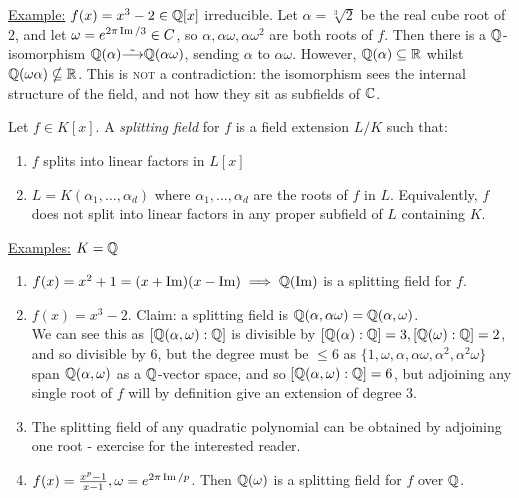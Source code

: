 \documentclass[a4paper, 10pt, twocolumn]{amsart}
\begin{document}
\underline{Example:} $f(x) = x^3-2 \in \mathbb{Q}[x]$ irreducible. Let $\alpha=\sqrt[3]{2}$ be the real cube root of $2$, and let $\omega = e^{2\pi\operatorname{Im}/3} \in C$, so $\alpha, \alpha\omega, \alpha\omega^2$ are both roots of $f$. Then there is a $\mathbb{Q}$-isomorphism $\mathbb{Q}(\alpha)\tilde{\longrightarrow} \mathbb{Q}(\alpha\omega)$, sending $\alpha$ to $\alpha\omega$. However, $\mathbb{Q}(\alpha)\subseteq \mathbb{R}$ whilst $\mathbb{Q}(\omega\alpha) \nsubseteq \mathbb{R}$. This is \textsc{not} a contradiction: the isomorphism sees the internal structure of the field, and not how they sit as subfields of $\mathbb{C}$.

Let $f\in K[x]$. A \emph{splitting field} for $f$ is a field extension $L/K$ such that:
\begin{enumerate}
\item $f$ splits into linear factors in $L[x]$
\item $L=K(\alpha_1, \ldots, \alpha_d)$ where $\alpha_1, \ldots, \alpha_d$ are the roots of $f$ in $L$. Equivalently, $f$ does not split into linear factors in any proper subfield of $L$ containing $K$.
\end{enumerate}

\underline{Examples:} $K = \mathbb{Q}$
\begin{enumerate}
\item $f(x) = x^2+1 = (x+\operatorname{Im})(x-\operatorname{Im}) \implies \mathbb{Q}(\operatorname{Im})$ is a splitting field for $f$.
\item $f(x) = x^3-2$. Claim: a splitting field is $\mathbb{Q}(\alpha, \alpha\omega) = \mathbb{Q}(\alpha,\omega)$.\\
We can see this as $[\mathbb{Q}(\alpha,\omega):\mathbb{Q}]$ is divisible by $[\mathbb{Q}(\alpha):\mathbb{Q}]=3, [\mathbb{Q}(\omega):\mathbb{Q}] = 2$, and so divisible by $6$, but the degree must be $\leq 6$ as $\{1, \omega, \alpha, \alpha\omega, \alpha^2, \alpha^2\omega\}$ span $\mathbb{Q}(\alpha,\omega)$ as a $\mathbb{Q}$-vector space, and so $[\mathbb{Q}(\alpha,\omega):\mathbb{Q}]=6$, but adjoining any single root of $f$ will by definition give an extension of degree $3$.
\item The splitting field of any quadratic polynomial can be obtained by adjoining one root - exercise for the interested reader.
\item $f(x) = \frac{x^p-1}{x-1}, \omega = e^{2\pi\operatorname{Im}/p}$. Then $\mathbb{Q}(\omega)$ is a splitting field for $f$ over $\mathbb{Q}$.
\end{enumerate}
\end{document}

